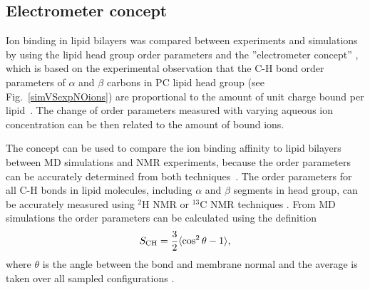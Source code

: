 \documentclass[aip,jcp,twocolumn]{revtex4}
\begin{document}



\subsection{Electrometer concept} \label{section:electrometer}
Ion binding in lipid bilayers was compared between experiments and simulations by 
using the lipid head group order parameters and the
''electrometer concept'' \cite{seelig87,catte16}, which
is based on the experimental observation that the C-H bond
order parameters of $\alpha$ and $\beta$ carbons in PC lipid head group
(see Fig.~\ref{simVSexpNOions}) are proportional to the amount 
of unit charge bound per lipid~\cite{seelig87}.
The change of order parameters measured with varying aqueous
ion concentration can be then related to the amount of bound ions.

The concept can be used to compare the ion binding affinity to lipid 
bilayers between MD simulations and  NMR experiments, because the order
parameters can be accurately determined from both techniques~\cite{catte16,ollila16}.
The order parameters for all C-H bonds in lipid molecules, including
$\alpha$ and $\beta$ segments in head group, can be accurately measured
using $^2$H NMR or $^{13}$C NMR techniques \cite{ollila16}. From MD simulations the
order parameters can be calculated using the definition
\begin{equation}\label{OP}
S_{\rm CH}=\frac{3}{2}\langle \cos^2\theta -1 \rangle,
\end{equation}
where $\theta$ is the angle between the bond and membrane
normal and the average is taken over all sampled configurations \cite{ollila16}.
\end{document}
